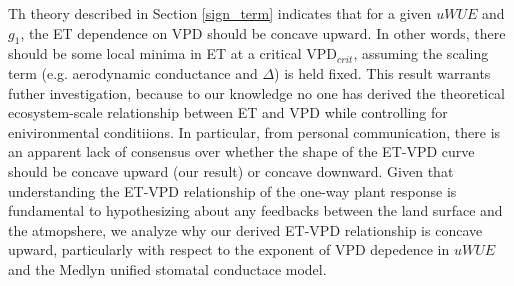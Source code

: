 \documentclass[draft,linenumbers]{agujournal}
\begin{document}
Th theory described in Section \ref{sign_term} indicates that for a given $uWUE$ and $g_1$, the ET dependence on VPD should be concave upward. In other words, there should be some local minima in ET at a critical VPD$_{crit}$, assuming the scaling term (e.g. aerodynamic conductance and $\Delta$) is held fixed. This result warrants futher investigation, because to our knowledge no one has derived the theoretical ecosystem-scale relationship between ET and VPD while controlling for enivironmental conditiions. In particular, from personal communication, there is an apparent lack of consensus over whether the shape of the ET-VPD curve should be concave upward (our result) or concave downward. Given that understanding the ET-VPD relationship of the one-way plant response is fundamental to hypothesizing about any feedbacks between the land surface and the atmopshere, we analyze why our derived ET-VPD relationship is concave upward, particularly with respect to the exponent of VPD depedence in $uWUE$ and the Medlyn unified stomatal conductace model.
\end{document}
